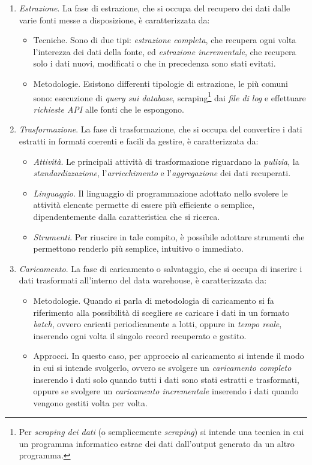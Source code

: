 \begin{enumerate}
    \item \textit{Estrazione}. La fase di estrazione, che si occupa del recupero dei dati dalle varie fonti messe a disposizione, è caratterizzata da:
    \begin{itemize}
        \item Tecniche. Sono di due tipi: \textit{estrazione completa}, che recupera ogni volta l'interezza dei dati della fonte, ed \textit{estrazione incrementale}, che recupera solo i dati nuovi, modificati o che in precedenza sono stati evitati.
        \item Metodologie. Esistono differenti tipologie di estrazione, le più comuni sono: esecuzione di \textit{query sui database}, scraping\footnote{Per \textit{scraping dei dati} (o semplicemente \textit{scraping}) si intende una tecnica in cui un programma informatico estrae dei dati dall'output generato da un altro programma.} dai \textit{file di log} e effettuare \textit{richieste API} alle fonti che le espongono.
    \end{itemize}
    \item \textit{Trasformazione}. La fase di trasformazione, che si occupa del convertire i dati estratti in formati coerenti e facili da gestire, è caratterizzata da:
    \begin{itemize}
        \item \textit{Attività}. Le principali attività di trasformazione riguardano la \textit{pulizia}, la \textit{standardizzazione}, l'\textit{arricchimento} e l'\textit{aggregazione} dei dati recuperati.
        \item \textit{Linguaggio}. Il linguaggio di programmazione adottato nello svolere le attività elencate permette di essere più efficiente o semplice, dipendentemente dalla caratteristica che si ricerca.
        \item \textit{Strumenti}. Per riuscire in tale compito, è possibile adottare strumenti che permettono renderlo più semplice, intuitivo o immediato.
    \end{itemize}
    \item \textit{Caricamento}. La fase di caricamento o salvataggio, che si occupa di inserire i dati trasformati all'interno del data warehouse, è caratterizzata da:
    \begin{itemize}
        \item Metodologie. Quando si parla di metodologia di caricamento si fa riferimento alla possibilità di scegliere se caricare i dati in un formato \textit{batch}, ovvero caricati periodicamente a lotti, oppure in \textit{tempo reale}, inserendo ogni volta il singolo record recuperato e gestito.
        \item Approcci. In questo caso, per approccio al caricamento si intende il modo in cui si intende svolgerlo, ovvero se svolgere un \textit{caricamento completo} inserendo i dati solo quando tutti i dati sono stati estratti e trasformati, oppure se svolgere un \textit{caricamento incrementale} inserendo i dati  quando vengono gestiti volta per volta.
    \end{itemize}
\end{enumerate}

